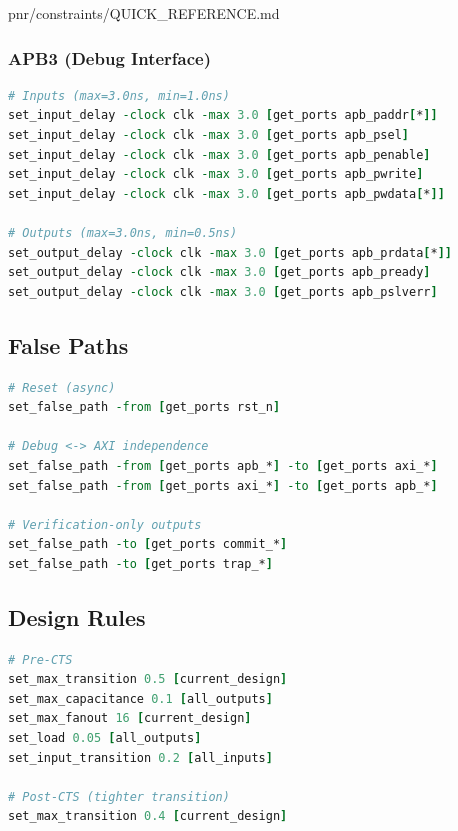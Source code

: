 \begin{relocated}{pnr/constraints/QUICK_REFERENCE.md}
\subsubsection{APB3 (Debug Interface)}\label{tm:pd:constraints-quick-reference:apb3-debug-interface}

\begin{lstlisting}[language=tcl]
# Inputs (max=3.0ns, min=1.0ns)
set_input_delay -clock clk -max 3.0 [get_ports apb_paddr[*]]
set_input_delay -clock clk -max 3.0 [get_ports apb_psel]
set_input_delay -clock clk -max 3.0 [get_ports apb_penable]
set_input_delay -clock clk -max 3.0 [get_ports apb_pwrite]
set_input_delay -clock clk -max 3.0 [get_ports apb_pwdata[*]]

# Outputs (max=3.0ns, min=0.5ns)
set_output_delay -clock clk -max 3.0 [get_ports apb_prdata[*]]
set_output_delay -clock clk -max 3.0 [get_ports apb_pready]
set_output_delay -clock clk -max 3.0 [get_ports apb_pslverr]
\end{lstlisting}

\subsection{False Paths}\label{tm:pd:constraints-quick-reference:false-paths}

\begin{lstlisting}[language=tcl]
# Reset (async)
set_false_path -from [get_ports rst_n]

# Debug <-> AXI independence
set_false_path -from [get_ports apb_*] -to [get_ports axi_*]
set_false_path -from [get_ports axi_*] -to [get_ports apb_*]

# Verification-only outputs
set_false_path -to [get_ports commit_*]
set_false_path -to [get_ports trap_*]
\end{lstlisting}

\subsection{Design Rules}\label{tm:pd:constraints-quick-reference:design-rules}

\begin{lstlisting}[language=tcl]
# Pre-CTS
set_max_transition 0.5 [current_design]
set_max_capacitance 0.1 [all_outputs]
set_max_fanout 16 [current_design]
set_load 0.05 [all_outputs]
set_input_transition 0.2 [all_inputs]

# Post-CTS (tighter transition)
set_max_transition 0.4 [current_design]
\end{lstlisting}


\end{relocated}
